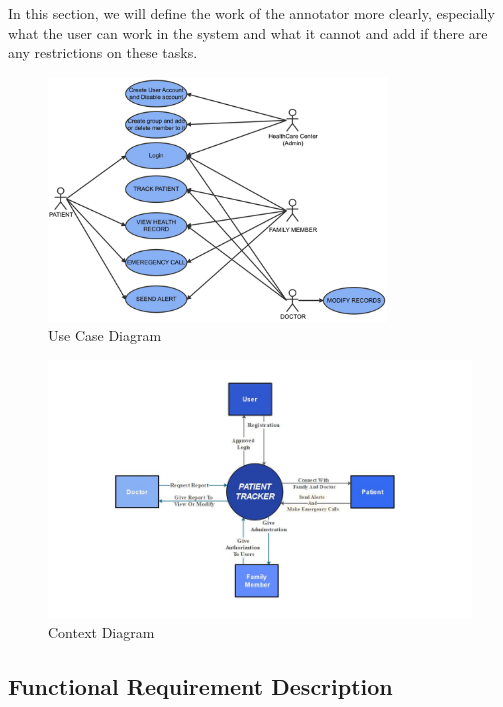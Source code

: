 \documentclass[12pt]{article}
\begin{document}
			\quad In this section, we will define the work of the annotator more clearly, especially what the user can work in the system and what it cannot and add if there are any restrictions on these tasks.
			\begin{figure}[!h]
				\centering
				\includegraphics[width=0.8\textwidth]{use-diagram.png}
				\caption{Use Case Diagram}
				\label{Use Diagram}
			\end{figure}
			\begin{figure}[!h]
				\centering
				\includegraphics[width=\textwidth]{context-diagram.jpg}
				\caption{Context Diagram}
				\label{Context Diagram}
			\end{figure}
		\newpage
		\begin{center}
			\newpage
		\end{center}
	   
		\subsection{Functional Requirement Description}
		
\end{document}
